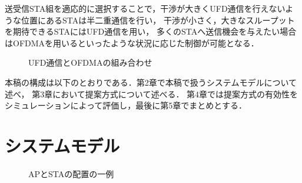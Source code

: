 \documentclass[technicalreport]{ieicej}
\begin{document}
	送受信STA組を適応的に選択することで，干渉が大きくUFD通信を行えないような位置にあるSTAは半二重通信を行い，
	干渉が小さく，大きなスループットを期待できるSTAにはUFD通信を用い，
	多くのSTAへ送信機会を与えたい場合はOFDMAを用いるといったような状況に応じた制御が可能となる．
	\begin{figure}[t]
		\centering
		\caption{UFD通信とOFDMAの組み合わせ}
		\label{fig:ofdma}
	\end{figure}
	\par
	本稿の構成は以下のとおりである．第2章で本稿で扱うシステムモデルについて述べ，
	第3章において提案方式について述べる．
	第4章では提案方式の有効性をシミュレーションによって評価し，最後に第5章でまとめとする．

\section{システムモデル}\label{seq:system}
	\begin{figure}[t]
		\centering
		\caption{APとSTAの配置の一例}
		\label{fig:model}
	\end{figure}
\end{document}
